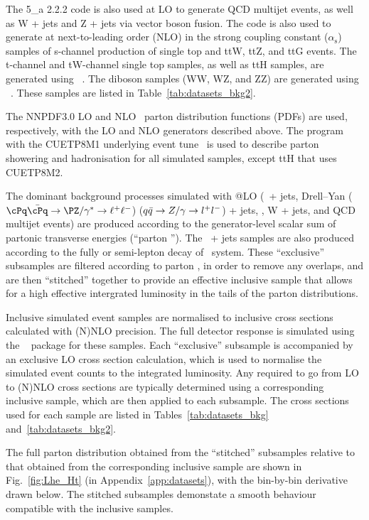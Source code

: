 The {\MADGRAPH{}5\_a\MCATNLO} 2.2.2 code is also used at LO to
generate QCD multijet events, as well as W + jets and Z + jets via
vector boson fusion. The \MADGRAPH{} code is also used to generate at
next-to-leading order (NLO) in the strong coupling constant
($\alpha_\textrm{s}$) samples of s-channel production of single top
and ttW, ttZ, and ttG events. The t-channel and tW-channel single top
samples, as well as ttH samples, are generated using
\POWHEG~\cite{}. The diboson samples (WW, WZ, and ZZ) are generated
using \PYTHIA~\cite{}. These samples are listed in
Table~\ref{tab:datasets_bkg2}.

The {NNPDF}3.0 LO and NLO~\cite{nnpdf} parton distribution functions
(PDFs) are used, respectively, with the LO and NLO generators
described above. The \PYTHIA program with the CUETP8M1 underlying
event tune~\cite{Khachatryan:2015pea} is used to describe parton
showering and hadronisation for all simulated samples, except ttH that
uses CUETP8M2.

The dominant background processes simulated with \MADGRAPH{}@LO
(\znunu\ + jets, Drell--Yan ($\cPq\bar{\cPq} \to \PZ/\gamma^* \to
\ell^+\ell^-$) ($q\bar{q} \rightarrow Z/\gamma \rightarrow l^+l^-$) + jets, \gj, W +
jets, and QCD multijet events) are produced according to the
generator-level scalar sum of partonic transverse energies (``parton
\scalht''). The \ttbar\ + jets samples are also produced according to
the fully or semi-lepton decay of \ttbar\ system. These ``exclusive''
subsamples are filtered according to parton \scalht, in order to
remove any overlaps, and are then ``stitched'' together to provide an
effective inclusive sample that allows for a high effective
intergrated luminosity in the tails of the parton \scalht
distributions.

Inclusive simulated event samples are normalised to inclusive cross
sections calculated with (N)NLO precision. The full detector response
is simulated using the \GEANTfour~\cite{geant} package for these
samples. Each ``exclusive'' subsample is accompanied by an exclusive
LO cross section calculation, which is used to normalise the simulated
event counts to the integrated luminosity. Any \kfactors required to
go from LO to (N)NLO cross sections are typically determined using a
corresponding inclusive sample, which are then applied to each
subsample. The cross sections used for each sample are listed in
Tables~\ref{tab:datasets_bkg} and~\ref{tab:datasets_bkg2}.

The full parton \scalht distribution obtained from the ``stitched''
subsamples relative to that obtained from the corresponding inclusive
sample are shown in Fig.~\ref{fig:Lhe_Ht} (in
Appendix~\ref{app:datasets}), with the bin-by-bin derivative drawn
below. The stitched subsamples demonstate a smooth behaviour
compatible with the inclusive samples.

